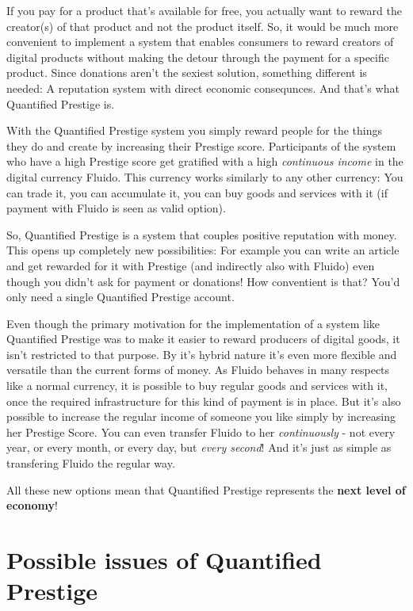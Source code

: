\documentclass[a4paper,12pt]{scrartcl}
\newcounter{motivation}
\newcounter{example}
\begin{document}
If you pay for a product that's available for free, you actually want to reward the creator(s) of that product and not the product itself. So, it would be much more convenient to implement a system that enables consumers to reward creators of digital products without making the detour through the payment for a specific product. Since donations aren't the sexiest solution, something different is needed: A reputation system with direct economic consequnces. And that's what Quantified Prestige is.

With the Quantified Prestige system you simply reward people for the things they do and create by increasing their Prestige score. Participants of the system who have a high Prestige score get gratified with a high \textit{continuous income} in the digital currency Fluido. This currency works similarly to any other currency: You can trade it, you can accumulate it, you can buy goods and services with it (if payment with Fluido is seen as valid option).

So, Quantified Prestige is a system that couples positive reputation with money. This opens up completely new possibilities: For example you can write an article and get rewarded for it with Prestige (and indirectly also with Fluido) even though you didn't ask for payment or donations! How conventient is that? You'd only need a single Quantified Prestige account.

Even though the primary motivation for the implementation of a system like Quantified Prestige was to make it easier to reward producers of digital goods, it isn't restricted to that purpose. By it's hybrid nature it's even more flexible and versatile than the current forms of money. As Fluido behaves in many respects like a normal currency, it is possible to buy regular goods and services with it, once the required infrastructure for this kind of payment is in place. But it's also possible to increase the regular income of someone you like simply by increasing her Prestige Score. You can even transfer Fluido to her \textit{continuously} - not every year, or every month, or every day, but \textit{every second}! And it's just as simple as transfering Fluido the regular way.

All these new options mean that Quantified Prestige represents the \textbf{next level of economy}!

\section{Possible issues of Quantified Prestige}
\end{document}
